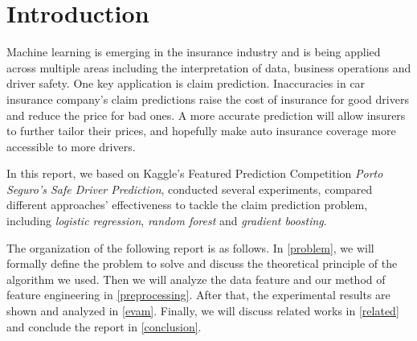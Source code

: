 \documentclass{standalone}
\begin{document}
\section{Introduction}

Machine learning is emerging in the insurance industry and is being applied
across multiple areas including the interpretation of data, business operations
and driver safety. One key application is claim prediction. Inaccuracies in car
insurance company's claim predictions raise the cost of insurance for good
drivers and reduce the price for bad ones. A more accurate prediction will
allow insurers to further tailor their prices, and hopefully make auto
insurance coverage more accessible to more drivers.

In this report, we based on Kaggle's Featured Prediction Competition
\emph{Porto Seguro's Safe Driver Prediction}\cite{kaggle}, conducted several
experiments, compared different approaches' effectiveness to tackle the claim
prediction problem, including \emph{logistic regression}, \emph{random forest}
and \emph{gradient boosting}.

The organization of the following report is as follows. In \cref{problem}, we
will formally define the problem to solve and discuss the theoretical principle
of the algorithm we used. Then we will analyze the data feature and our method
of feature engineering in \cref{preprocessing}. After that, the experimental
results are shown and analyzed in \cref{evam}. Finally, we will discuss related
works in \cref{related} and conclude the report in \cref{conclusion}.
\end{document}

